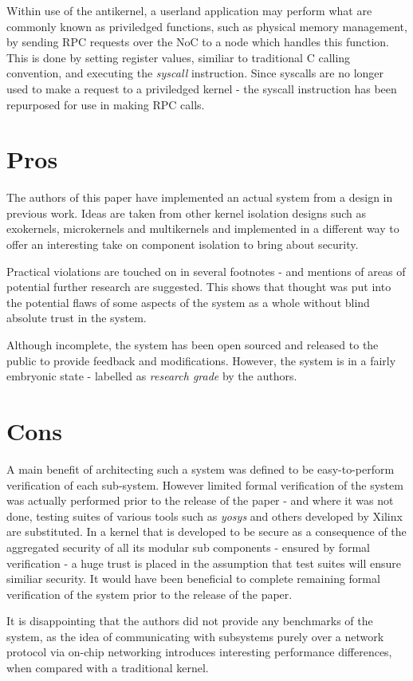 \documentclass{article}
\begin{document}
Within use of the antikernel, a userland application may perform what are commonly known as priviledged functions, such as physical memory management, by sending RPC requests over the NoC to a node which handles this function. This is done by setting register values, similiar to traditional C calling convention, and executing the \textit{syscall} instruction. Since syscalls are no longer used to make a request to a priviledged kernel - the syscall instruction has been repurposed for use in making RPC calls.

\section*{Pros}
The authors of this paper have implemented an actual system from a design in previous work. Ideas are taken from other kernel isolation designs such as exokernels, microkernels and multikernels and implemented in a different way to offer an interesting take on component isolation to bring about security.

Practical violations are touched on in several footnotes - and mentions of areas of potential further research are suggested. This shows that thought was put into the potential flaws of some aspects of the system as a whole without blind absolute trust in the system.

Although incomplete, the system has been open sourced and released to the public to provide feedback and modifications. However, the system is in a fairly embryonic state - labelled as \textit{research grade} by the authors.

\section*{Cons}
A main benefit of architecting such a system was defined to be easy-to-perform verification of each sub-system. However limited formal verification of the system was actually performed prior to the release of the paper - and where it was not done, testing suites of various tools such as \textit{yosys} and others developed by Xilinx are substituted.
In a kernel that is developed to be secure as a consequence of the aggregated security of all its modular sub components - ensured by formal verification - a huge trust is placed in the assumption that test suites will ensure similiar security. It would have been beneficial to complete remaining formal verification of the system prior to the release of the paper.

It is disappointing that the authors did not provide any benchmarks of the system, as the idea of communicating with subsystems purely over a network protocol via on-chip networking introduces interesting performance differences, when compared with a traditional kernel.
\end{document}
